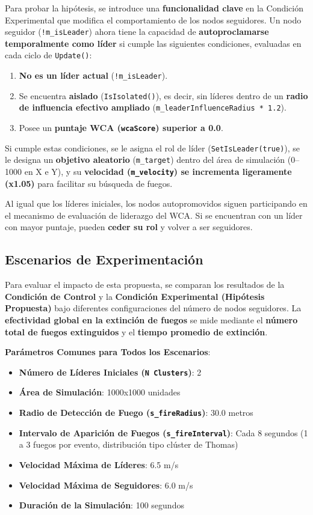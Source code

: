 \documentclass{article}
\begin{document}
Para probar la hipótesis, se introduce una \textbf{funcionalidad clave} en la Condición Experimental que modifica el comportamiento de los nodos seguidores. Un nodo seguidor (\texttt{!m\_isLeader}) ahora tiene la capacidad de \textbf{autoproclamarse temporalmente como líder} si cumple las siguientes condiciones, evaluadas en cada ciclo de \texttt{Update()}:

\begin{enumerate}
  \item \textbf{No es un líder actual} (\texttt{!m\_isLeader}).
  \item Se encuentra \textbf{aislado} (\texttt{IsIsolated()}), es decir, sin líderes dentro de un \textbf{radio de influencia efectivo ampliado} (\texttt{m\_leaderInfluenceRadius * 1.2}).
  \item Posee un \textbf{puntaje WCA (\texttt{wcaScore}) superior a 0.0}.
\end{enumerate}

Si cumple estas condiciones, se le asigna el rol de líder (\texttt{SetIsLeader(true)}), se le designa un \textbf{objetivo aleatorio} (\texttt{m\_target}) dentro del área de simulación (0--1000 en X e Y), y su \textbf{velocidad (\texttt{m\_velocity}) se incrementa ligeramente (x1.05)} para facilitar su búsqueda de fuegos.

Al igual que los líderes iniciales, los nodos autopromovidos siguen participando en el mecanismo de evaluación de liderazgo del WCA. Si se encuentran con un líder con mayor puntaje, pueden \textbf{ceder su rol} y volver a ser seguidores.

\subsection*{Escenarios de Experimentación}

Para evaluar el impacto de esta propuesta, se comparan los resultados de la \textbf{Condición de Control} y la \textbf{Condición Experimental (Hipótesis Propuesta)} bajo diferentes configuraciones del número de nodos seguidores. La \textbf{efectividad global en la extinción de fuegos} se mide mediante el \textbf{número total de fuegos extinguidos} y el \textbf{tiempo promedio de extinción}.

\textbf{Parámetros Comunes para Todos los Escenarios}:

\begin{itemize}
  \item \textbf{Número de Líderes Iniciales (\texttt{N Clusters})}: 2
  \item \textbf{Área de Simulación}: 1000x1000 unidades
  \item \textbf{Radio de Detección de Fuego (\texttt{s\_fireRadius})}: 30.0 metros
  \item \textbf{Intervalo de Aparición de Fuegos (\texttt{s\_fireInterval})}: Cada 8 segundos (1 a 3 fuegos por evento, distribución tipo clúster de Thomas)
  \item \textbf{Velocidad Máxima de Líderes}: 6.5 m/s
  \item \textbf{Velocidad Máxima de Seguidores}: 6.0 m/s
  \item \textbf{Duración de la Simulación}: 100 segundos
\end{itemize}
\end{document}
